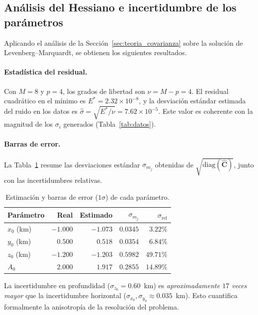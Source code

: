 \documentclass[12pt, a4paper]{article}
\begin{document}
\subsection{Análisis del Hessiano e incertidumbre de los parámetros}
\label{sec:analisis_hessiano}

Aplicando el análisis de la Sección~\ref{sec:teoria_covarianza}
sobre la solución de Levenberg--Marquardt, se obtienen los siguientes
resultados.

\paragraph{Estadística del residual.}
Con $M=8$ y $p=4$, los grados de libertad son $\nu = M - p = 4$. El
residual cuadrático en el mínimo es $E^* = 2.32\times 10^{-8}$, y la
desviación estándar estimada del ruido en los datos es
$\hat{\sigma} = \sqrt{E^*/\nu} = 7.62\times 10^{-5}$. Este valor es
coherente con la magnitud de los $\sigma_i$ generados (Tabla~\ref{tab:datos}).

\paragraph{Barras de error.}
La Tabla~\ref{tab:errores} resume las desviaciones estándar
$\sigma_{m_j}$ obtenidas de $\sqrt{\mathrm{diag}(\widehat{\mathbf{C}})}$,
junto con las incertidumbres relativas.

\begin{table}[H]
    \centering
    \caption{Estimación y barras de error ($1\sigma$) de cada parámetro.}
    \label{tab:errores}
    \begin{tabular}{lrrrr}
        \toprule
        \textbf{Parámetro} & \textbf{Real} & \textbf{Estimado} &
        $\sigma_{m_j}$ & $\sigma_{\text{rel}}$ \\
        \midrule
        $x_0$ (km) & $-1.000$ & $-1.073$ & $0.0345$ & $3.22\%$ \\
        $y_0$ (km) & $ 0.500$ & $ 0.518$ & $0.0354$ & $6.84\%$ \\
        $z_0$ (km) & $-1.200$ & $-1.203$ & $0.5982$ & $49.71\%$ \\
        $A_0$       & $ 2.000$ & $ 1.917$ & $0.2855$ & $14.89\%$ \\
        \bottomrule
    \end{tabular}
\end{table}

La incertidumbre en profundidad ($\sigma_{z_0} = 0.60$~km) es
\emph{aproximadamente $17$ veces mayor} que la incertidumbre horizontal
($\sigma_{x_0}, \sigma_{y_0} \approx 0.035$~km). Esto cuantifica
formalmente la anisotropía de la resolución del problema.
\end{document}
